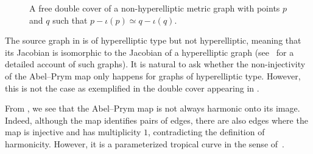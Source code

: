 \begin{exam}
\begin{figure}[ht]
 \caption{A free double cover of a non-hyperelliptic metric graph with points $p$ and $q$ such that $p-\iota(p)\simeq q-\iota(q)$.}
    \label{hyptype}
\end{figure}
\end{exam}




\begin{rema}\label{rem:hyperellipticType}
    The source graph in 
    is of hyperelliptic type but not hyperelliptic, meaning that its Jacobian is isomorphic to the Jacobian of a hyperelliptic graph (see~\cite{C} for a detailed account of such graphs). 
  It is natural to ask whether the non-injectivity of the Abel--Prym map only happens for graphs of hyperelliptic type. However, this is not the case as exemplified in the double cover appearing in .
\end{rema}


\begin{rema} 
From , we see that the Abel--Prym map is not always  harmonic  onto its image. Indeed, although the map identifies pairs of edges, there are also edges where the map is injective and has multiplicity $1$, contradicting the definition of harmonicity.
However, it is a parameterized tropical curve in the sense of~\cite[Definition 3.1]{Blomme_CurvesInAbelian1}.
\end{rema}

